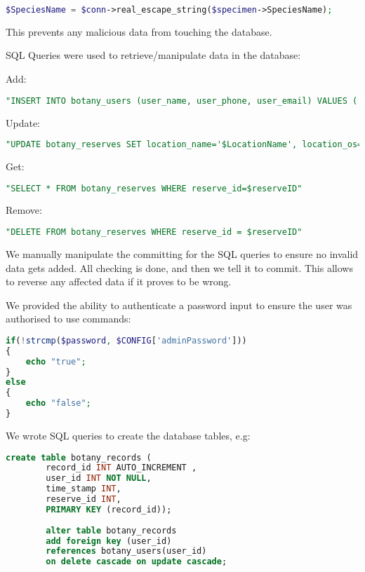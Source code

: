         \begin{lstlisting}[language=php]
$SpeciesName = $conn->real_escape_string($specimen->SpeciesName);
        \end{lstlisting}
        
        This prevents any malicious data from touching the database.

        SQL Queries were used to retrieve/manipulate data in the database:

        Add:
        \begin{lstlisting}[language=sql]
"INSERT INTO botany_users (user_name, user_phone, user_email) VALUES ('$UserName', '$UserPhone', '$UserEmail')"
        \end{lstlisting}

        Update:
        \begin{lstlisting}[language=sql]
"UPDATE botany_reserves SET location_name='$LocationName', location_os='$LocationOS', description='$Description' WHERE reserve_id = $ReserveID"
        \end{lstlisting}
            
        Get:
        \begin{lstlisting}[language=sql]
"SELECT * FROM botany_reserves WHERE reserve_id=$reserveID"
        \end{lstlisting}
        
        Remove:
        \begin{lstlisting}[language=sql]
"DELETE FROM botany_reserves WHERE reserve_id = $reserveID"
        \end{lstlisting}

        We manually manipulate the committing for the SQL queries to ensure no invalid data gets added. All checking is done, and then we tell it to commit. This allows to reverse any affected data if it proves to be wrong.

        We provided the ability to authenticate a password input to ensure the user was authorised to use commands:
        \begin{lstlisting}[language=php]
if(!strcmp($password, $CONFIG['adminPassword']))    
{
    echo "true";
}
else
{
    echo "false";
}
        \end{lstlisting}
    
    We wrote SQL queries to create the database tables, e.g:
    \begin{lstlisting}[language=sql]
        create table botany_records ( 
        record_id INT AUTO_INCREMENT , 
        user_id INT NOT NULL, 
        time_stamp INT,
        reserve_id INT,
        PRIMARY KEY (record_id));
        
        alter table botany_records
        add foreign key (user_id)  
        references botany_users(user_id)  
        on delete cascade on update cascade;
    \end{lstlisting}

